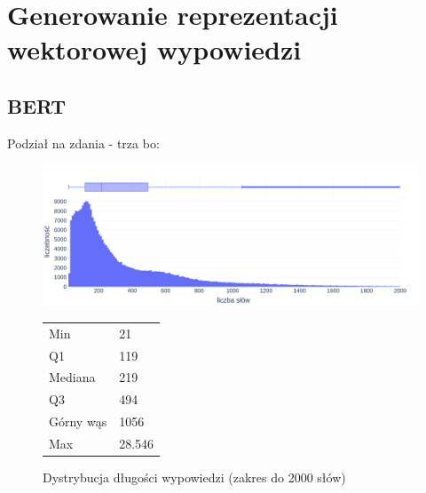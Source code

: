 
\chapter{Generowanie reprezentacji wektorowej wypowiedzi}

\section{BERT}



  Podział na zdania - trza bo:
  \begin{figure}[ht]
    \begin{minipage}{.75\textwidth}
      \includegraphics[width=\textwidth]{rys03/word_count.png}
      \label{fig:word_count}
    \end{minipage}%
    \begin{minipage}{.25\textwidth}
      \label{tab:word_count}
      \small
      \begin{tabularx}{\textwidth}{l|l}
        Min & 21 \\ 
        Q1 & 119 \\ 
        Mediana & 219 \\
        Q3 & 494 \\ 
        Górny wąs & 1056 \\
        Max & 28.546 \\
      \end{tabularx}
    \end{minipage}
    \caption{Dystrybucja długości wypowiedzi (zakres do 2000 słów)}
  \end{figure}